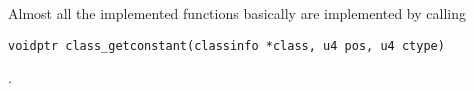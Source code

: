 \documentclass[a4paper, 10pt, titlepage]{scrartcl} %
\begin{document}
Almost all the implemented functions basically are implemented by calling
\begin{scriptsize}\verb|voidptr|\hspace{0.0pt}\verb| |\hspace{0.0pt}\verb|class_getconstant|\hspace{0.0pt}\verb|(|\hspace{0.0pt}\verb|classinfo|\hspace{0.0pt}\verb| |\hspace{0.0pt}\verb||\hspace{0.0pt}\verb|*|\hspace{0.0pt}\verb|class|\hspace{0.0pt}\verb|,|\hspace{0.0pt}\verb||\hspace{0.0pt}\verb| |\hspace{0.0pt}\verb|u4|\hspace{0.0pt}\verb| |\hspace{0.0pt}\verb|pos|\hspace{0.0pt}\verb|,|\hspace{0.0pt}\verb||\hspace{0.0pt}\verb| |\hspace{0.0pt}\verb|u4|\hspace{0.0pt}\verb| |\hspace{0.0pt}\verb|ctype|\hspace{0.0pt}\verb|)|\hspace{0.0pt}\verb||\end{scriptsize}.
\end{document}
